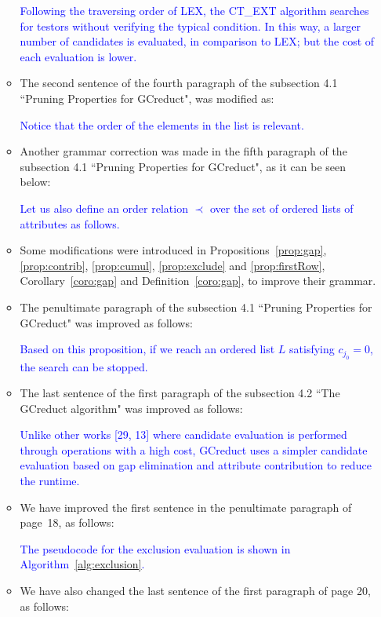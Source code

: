 \documentclass{letter}
\begin{document}
\begin{letter}{}
\begin{enumerate}
\begin{itemize}
		\textcolor{blue}{Following the traversing order of LEX, the CT\_EXT algorithm searches for testors without verifying the typical condition. In this way, a larger number of candidates is evaluated, in comparison to LEX; but the cost of each evaluation is lower.}
		
		\item The second sentence of the fourth paragraph of the subsection 4.1 ``Pruning Properties for GCreduct", was modified as:
		
		\textcolor{blue}{Notice that the order of the elements in the list is relevant.}
		 
		\item Another grammar correction was made in the fifth paragraph of the subsection 4.1 ``Pruning Properties for GCreduct", as it can be seen below:
		
		\textcolor{blue}{Let us also define an order relation $\prec$ over the set of ordered lists of attributes as follows.}
		
		\item Some modifications were introduced in Propositions~\ref{prop:gap}, \ref{prop:contrib}, \ref{prop:cumul}, \ref{prop:exclude} and \ref{prop:firstRow}, Corollary~\ref{coro:gap} and Definition~\ref{coro:gap}, to improve their grammar.  
		
		\item The penultimate paragraph of the subsection 4.1 ``Pruning Properties for GCreduct" was improved as follows:
		
		\textcolor{blue}{Based on this proposition, if we reach an ordered list $L$ satisfying $c_{j_0}=0$, the search can be stopped.}
		
		\item The last sentence of the first paragraph of the subsection 4.2 ``The GCreduct algorithm" was improved as follows:
		
	    \textcolor{blue}{Unlike other works [29, 13] where candidate evaluation is performed through operations with a high cost, GCreduct uses a simpler candidate evaluation based on gap elimination and attribute contribution to reduce the runtime.}
		
		\item We have improved the first sentence in the penultimate paragraph of page~18, as follows:
		
		\textcolor{blue}{The pseudocode for the exclusion evaluation is shown in Algorithm~\ref{alg:exclusion}.}
		
		\item We have also changed the last sentence of the first paragraph of page 20, as follows:
		

\end{itemize}
\end{enumerate}
\end{letter}
\end{document}
